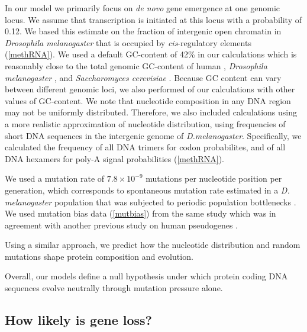 \documentclass[12pt,a4paper]{article}
\newcommand{\cmnt}[1]{{\color{purple} #1}}
\begin{document}
\cmnt{In our model we primarily focus on \textit{de novo} gene emergence at one genomic locus. We assume that transcription is initiated at this locus with a probability of 0.12. We based this estimate on the fraction of intergenic open chromatin in \textit{Drosophila melanogaster} that is occupied by \textit{cis}-regulatory elements (\autoref{methRNA})}. We used a default GC-content of 42\% in our calculations which is reasonably close to the total genomic GC-content of human \citep[41\%,][]{Merchant2007}, \textit{Drosophila melanogaster} \citep[41.6\%,][]{flybase}, and \textit{Saccharomyces cerevisiae} \citep[38\%,][]{yeastGC}. Because GC content can vary between different genomic loci, we also performed of our calculations with other values of GC-content. \cmnt{We note that nucleotide composition in any DNA region may not be uniformly distributed. Therefore, we also included calculations using a more realistic approximation of nucleotide distribution, using frequencies of short DNA sequences in the intergenic genome of \textit{D.melanogaster}. Specifically, we calculated the frequency of all DNA trimers for codon probabilites, and of all DNA hexamers for poly-A signal probabilities (\autoref{methRNA}).} 

We used a mutation rate of $7.8\times10^{-9}$ mutations per nucleotide position per generation, which corresponds to spontaneous mutation rate estimated in a \textit{D. melanogaster} population that was subjected to periodic population bottlenecks \cite[mutation accumulation line,][]{drosophilamutrate}. We used mutation bias data (\autoref{mutbias}) from the same study \citep{drosophilamutrate} which was in agreement with another previous study on human pseudogenes \citep{humanmutrate}.

Using a similar approach, we predict how the nucleotide distribution and random mutations shape protein composition and evolution. 

Overall, our models define a null hypothesis under which protein coding DNA sequences evolve neutrally through mutation pressure alone.

\subsection{How likely is gene loss?}
\end{document}
